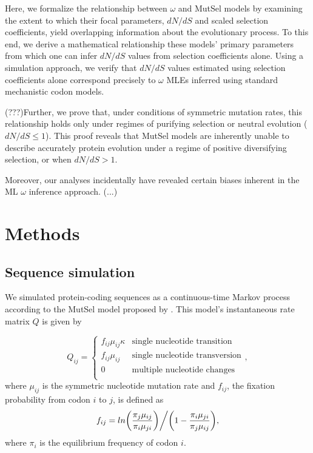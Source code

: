 \documentclass[11pt]{article}
\begin{document}
Here, we formalize the relationship between $\omega$ and MutSel models by examining the extent to which their focal parameters, $dN/dS$ and scaled selection coefficients, yield overlapping information about the evolutionary process. To this end, we derive a mathematical relationship these models' primary parameters from which one can infer $dN/dS$ values from selection coefficients alone. Using a simulation approach, we verify that $dN/dS$ values estimated using selection coefficients alone correspond precisely to $\omega$ MLEs inferred using standard mechanistic codon models. 

(???)Further, we prove that, under conditions of symmetric mutation rates, this relationship holds only under regimes of purifying selection or neutral evolution ($dN/dS \leq 1$). This proof reveals that MutSel models are inherently unable to describe accurately protein evolution under a regime of positive diversifying selection, or when $dN/dS > 1$.

Moreover, our analyses incidentally have revealed certain biases inherent in the ML $\omega$ inference approach. (...)
 


\section*{Methods}

\subsection*{Sequence simulation}
We simulated protein-coding sequences as a continuous-time Markov
process \cite{Yang2006} according to the MutSel model proposed by \cite{HalpernBruno1998}. This model's instantaneous rate matrix $Q$ is given by 

\begin{equation}
Q_{ij} = \left\{ \begin{array}{rl}
              f_{ij}\mu_{ij}\kappa               &\mbox{single nucleotide transition} \\
              f_{ij}\mu_{ij}                          &\mbox{single nucleotide transversion} \\
              0                                           &\mbox{multiple nucleotide changes} \\             
         \end{array} \right.,
\end{equation} where $\mu_{ij}$ is the symmetric nucleotide mutation rate and $f_{ij}$, the fixation probability from codon $i$ to $j$, is defined as \begin{equation}f_{ij} = ln\bigg{(}\frac{\pi_j\mu_{ij}}{\pi_i\mu_{ji}}\bigg{)}\bigg{/}\bigg{(}1 - \frac{\pi_i\mu_{ji}}{\pi_j\mu_{ij}}\bigg{)},\end{equation} where $\pi_i$ is the equilibrium frequency of codon $i$.
\end{document}
